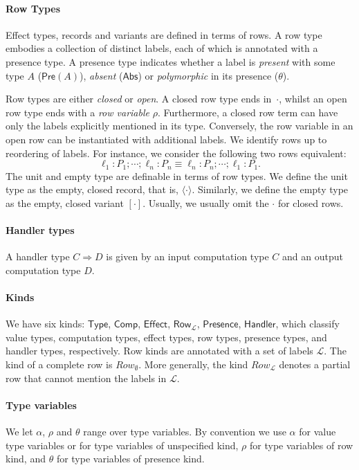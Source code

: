 \documentclass[12pt,mscres,cdtppar,twoside,openright,logo,rightchapter,normalheadings]{infthesis}
\theoremstyle{definition}
\newcommand{\Record}[1]{\ensuremath{\langle #1 \rangle}}
\newcommand{\Pre}[1]{\mathsf{Pre}(#1)}
\newcommand{\Abs}{\mathsf{Abs}}
\newcommand{\Presence}{\mathsf{Presence}}
\newcommand{\Row}{\mathsf{Row}}
\newcommand{\Type}{\mathsf{Type}}
\newcommand{\Comp}{\mathsf{Comp}}
\newcommand{\Effect}{\mathsf{Effect}}
\newcommand{\Handler}{\mathsf{Handler}}
\begin{document}
\paragraph{Row Types}
Effect types, records and variants are defined in terms of rows.
A row type embodies a collection of distinct labels, each of which is
annotated with a presence type. A presence type indicates whether a
label is \emph{present} with some type $A$ ($\Pre{A}$), \emph{absent}
($\Abs$) or \emph{polymorphic} in its presence ($\theta$).

Row types are either \emph{closed} or \emph{open}. A closed row type
ends in~$\cdot$, whilst an open row type ends with a \emph{row
  variable} $\rho$. Furthermore, a closed row term can have only the
labels explicitly mentioned in its type. Conversely, the row variable
in an open row can be instantiated with additional labels. We identify
rows up to reordering of labels. For instance, we consider the
following two rows equivalent:
\[ \ell_1 : P_1; \cdots; \ell_n : P_n \equiv \ell_n : P_n; \cdots ; \ell_1 : P_1. \]
The unit and empty type are definable in terms of row types. We define
the unit type as the empty, closed record, that is,
$\Record{\cdot}$. Similarly, we define the empty type as the empty,
closed variant $[\cdot]$. Usually, we usually omit the $\cdot$ for
closed rows.

\paragraph{Handler types}
A handler type $C \Rightarrow D$ is given by an input computation type
$C$ and an output computation type $D$.

\paragraph{Kinds}
We have six kinds: $\Type$, $\Comp$, $\Effect$, $\Row_\mathcal{L}$,
$\Presence$, $\Handler$, which classify value types, computation
types, effect types, row types, presence types, and handler types,
respectively. Row kinds are annotated with a set of labels
$\mathcal{L}$. The kind of a complete row is
$Row_{\mathcal{\emptyset}}$. More generally, the kind
$Row_{\mathcal{L}}$ denotes a partial row that cannot mention the
labels in $\mathcal{L}$.
%

\paragraph{Type variables}
We let $\alpha$, $\rho$ and $\theta$ range over type variables. By
convention we use $\alpha$ for value type variables or for type
variables of unspecified kind, $\rho$ for type variables of row kind,
and $\theta$ for type variables of presence kind.
\end{document}
